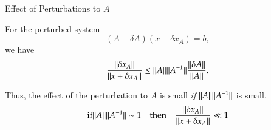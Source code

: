 \documentclass[10pt]{beamer}
\begin{document}
\begin{frame}{Effect of Perturbations to $A$}

{}


\begin{theorem}
For the perturbed system
\begin{equation*}
    (A + \delta A) (x + \delta x_A) = b, 
\end{equation*}
we have
\begin{equation*}
    \frac{{{\|\delta x_A\|}}}{{{\|x + \delta x_A\|}}} \le {\ensuremath{{\|A\|}}}{\ensuremath{{\|A^{-1}\|}}} \frac{{{\|\delta A\|}}}{{{\|A\|}}}.
\end{equation*}
\end{theorem}

Thus, the effect of the perturbation to $A$ is small
\emph{if} ${{\|A\|}}{{\|A^{-1}\|}}$ is small.
\begin{equation*}
	\text{if}    {\ensuremath{{\|A\|}}}{\ensuremath{{\|A^{-1}\|}}} \sim 1
    \quad \text{then} 
    \quad \frac{{{\|\delta x_A\|}}}{{{\|x + \delta x_A\|}}} \ll 1
\end{equation*}
\end{frame}
\end{document}
